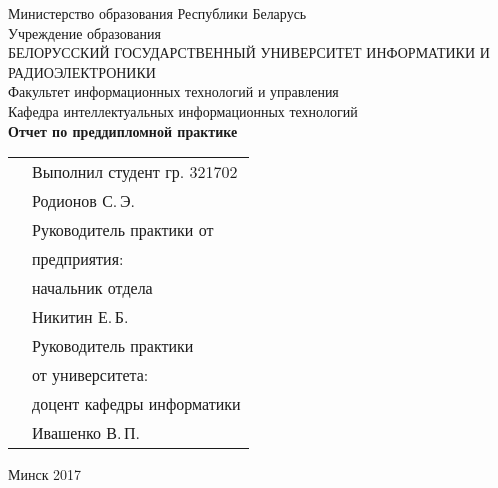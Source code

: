 \begin{titlepage}
    
    \begin{center}
        Министерство образования Республики Беларусь \\[0.4cm] 

        Учреждение образования \\

        \MakeUppercase{БЕЛОРУССКИЙ ГОСУДАРСТВЕННЫЙ УНИВЕРСИТЕТ ИНФОРМАТИКИ И РАДИОЭЛЕКТРОНИКИ} \\[0.4cm]

        Факультет информационных технологий и управления \\[0.4cm]

        Кафедра интеллектуальных информационных технологий \\[3.4cm] %

        {\large\bfseries{Отчет по преддипломной практике}} \\[2cm]

        \noindent
        \begin{tabular}{p{}p{}}
            & Выполнил студент гр. 321702 \\
            & Родионов С.\,Э. \\[1cm]

            & Руководитель практики от \\
            & предприятия: \\
            & начальник отдела \\
            & Никитин Е.\,Б. \\[1cm]

            & Руководитель практики \\
            & от университета: \\
            & доцент кафедры информатики \\
            & Ивашенко В.\,П. \\
        \end{tabular}

        \vfill

        {\normalsize Минск 2017}
    \end{center}

\end{titlepage}
